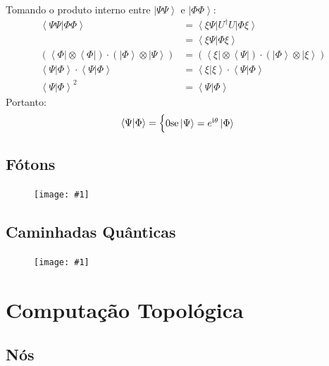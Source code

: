 \documentclass[t]{beamer}
\newcommand{\ii}{
	\rm{i}
}
\newcommand{\ket}[1]{\ensuremath{\left|#1\right\rangle}}
\newcommand{\bra}[1]{\ensuremath{\left\langle#1\right|}}
\newcommand{\braket}[2]{\ensuremath{\left\langle#1|#2\right\rangle}}
\newcommand{\imgw}[2]{%
\begin{center}
	\begin{figure}
	\texttt{[image: \#1]}\\
	\end{figure}
\end{center}
}
\begin{document}
	\begin{frame}{\subsecname}
		Tomando o produto interno entre $\ket{\Psi\Psi}$ e $\ket{\Phi\Phi}$:
		\begin{align*}
		\braket{\Psi\Psi}{\Phi\Phi} &= \bra{\xi\Psi}U^{\dagger} U \ket{\Phi\xi}\\
		&= \braket{\xi\Psi}{\Phi\xi}\\
		(\bra{\Phi} \otimes \bra{\Phi}) \cdot (\ket{\Phi} \otimes \ket{\Psi}) &= (\bra{\xi} \otimes \bra{\Psi}) \cdot (\ket{\Phi} \otimes \ket{\xi})\\
		\braket{\Psi}{\Phi} \cdot \braket{\Psi}{\Phi} &= \braket{\xi}{\xi} \cdot \braket{\Psi}{\Phi}\\
		\braket{\Psi}{\Phi}^2 &= \braket{\Psi}{\Phi}
		\end{align*}
		Portanto:
		\begin{align*}
			\braket{\Psi}{\Phi} = \begin{cases}
			0 \text{se} \ket{\Psi} = e^{\ii\theta}\ket{\Phi}
			\end{cases}
		\end{align*}
	\end{frame}
	
	\subsection{Fótons}	
	
	\begin{frame}{\subsecname}
		\imgw{superposition.pdf}{\textwidth}
	\end{frame}
	
	\subsection{Caminhadas Quânticas}
	
	\begin{frame}{\subsecname}
		\imgw{superposition.pdf}{\textwidth}
	\end{frame}

	\section{Computação Topológica}
	
	\subsection{Nós}
	
	\begin{frame}{\subsecname}
	
	\end{frame}	
	
\end{document}
